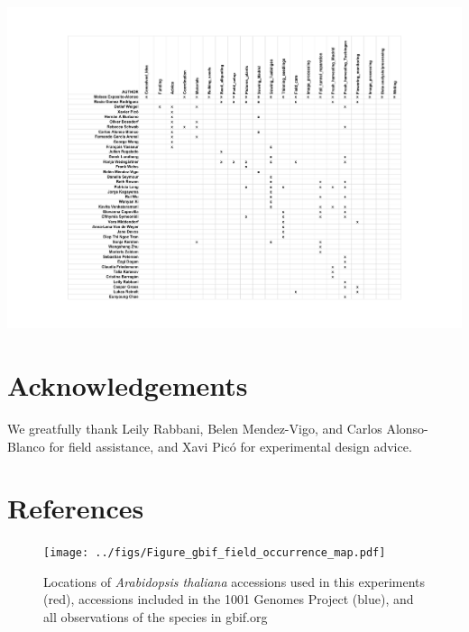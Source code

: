 \documentclass[12pt,]{article}
\begin{document}
\centerline{\includegraphics[width=7in]{../figs/People_paper.pdf}}

\section{Acknowledgements}\label{acknowledgements}

We greatfully thank Leily Rabbani, Belen Mendez-Vigo, and Carlos
Alonso-Blanco for field assistance, and Xavi Picó for experimental
design advice.

\section{References}\label{references}



\pagebreak

\begin{figure}
    \centerline{\texttt{[image: ../figs/Figure\_gbif\_field\_occurrence\_map.pdf]}}
    \caption{ Locations of \textit{Arabidopsis thaliana} accessions used in this experiments (red), accessions included in the 1001 Genomes Project (blue), and all observations of the species in gbif.org}
    \label{fig:ecotypes}
\end{figure}
\end{document}
